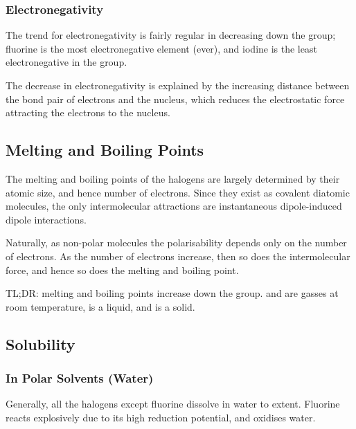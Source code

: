 

			\subsubsection{Electronegativity}

				The trend for electronegativity is fairly regular in decreasing down the group; fluorine is the most electronegative element
				(ever), and iodine is the least electronegative in the group.

				The decrease in electronegativity is explained by the increasing distance between the bond pair of electrons and the nucleus,
				which reduces the electrostatic force attracting the electrons to the nucleus.




		\subsection{Melting and Boiling Points}

			The melting and boiling points of the halogens are largely determined by their atomic size, and hence number of electrons. Since
			they exist as covalent diatomic molecules, the only intermolecular attractions are instantaneous dipole-induced dipole interactions.

			Naturally, as non-polar molecules the polarisability depends only on the number of electrons. As the number of electrons increase,
			then so does the intermolecular force, and hence so does the melting and boiling point.

			TL;DR: melting and boiling points increase down the group.  and  are gasses at room temperature,  is a
			liquid, and  is a solid.



		\subsection{Solubility}

			\subsubsection{In Polar Solvents (Water)}

				Generally, all the halogens except fluorine dissolve in water to  extent. Fluorine reacts explosively due to its high
				reduction potential, and oxidises water.

